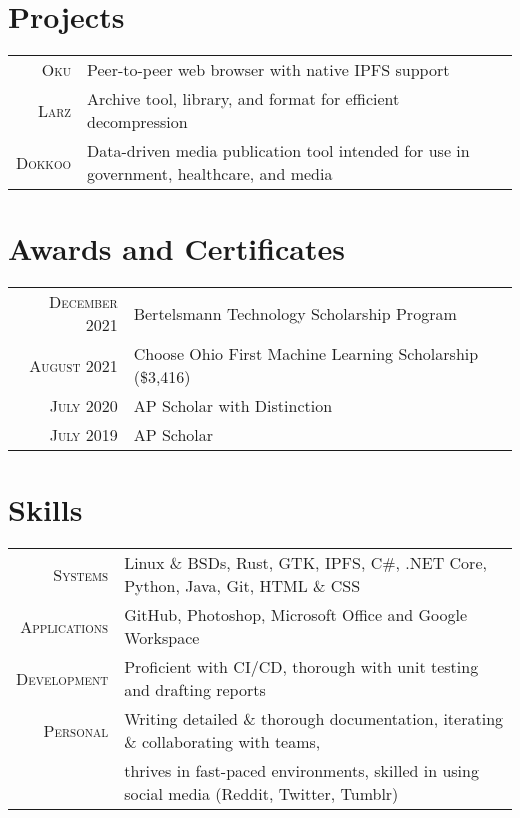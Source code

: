 \documentclass[a4paper,10pt]{article} %
\begin{document}

\section{Projects}

\begin{tabular}{rl}
\textsc{Oku} & Peer-to-peer web browser with native IPFS support\\
\textsc{Larz} & Archive tool, library, and format for efficient decompression\\
\textsc{Dokkoo} & Data-driven media publication tool intended for use in government, healthcare, and media\\
\end{tabular}


\section{Awards and Certificates}

\begin{tabular}{rl}
\textsc{December 2021} & Bertelsmann Technology Scholarship Program\\
\textsc{August 2021} & Choose Ohio First Machine Learning Scholarship \footnotesize(\$3,416)\normalsize\\
\textsc{July 2020} & AP Scholar with Distinction\\
\textsc{July 2019} & AP Scholar\\
\end{tabular}


\section{Skills}

\begin{tabular}{rl}
\textsc{Systems} & Linux \& BSDs, Rust, GTK, IPFS, C\#, .NET Core, Python, Java, Git, HTML \& CSS\\
\textsc{Applications} & GitHub, Photoshop, Microsoft Office and Google Workspace\\
\textsc{Development} & Proficient with CI/CD, thorough with unit testing and drafting reports\\
\textsc{Personal} & Writing detailed \& thorough documentation, iterating \& collaborating with teams,\\& thrives in fast-paced environments, skilled in using social media \footnotesize(Reddit, Twitter, Tumblr)\normalsize\\

\end{tabular}
\end{document}
